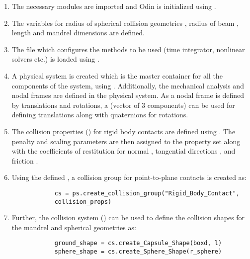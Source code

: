 \begin{enumerate}
    \item The necessary modules are imported and Odin is initialized using .
    \item The variables for radius of spherical collision geometries , radius of beam , length  and mandrel dimensions are defined.
    \item The  file which configures the methods to be used (time integrator, nonlinear solvers etc.) is loaded using .
    \item A physical system is created which is the master container for all the components of the system, using . Additionally, the mechanical analysis and nodal frames are defined in the physical system. As a nodal frame is defined by translations and rotations, a  (vector of 3 components) can be used for defining translations along with quaternions for rotations.
    \item The collision properties () for rigid body contacts are defined using . The penalty and scaling parameters are then assigned to the property set along with the coefficients of restitution for normal , tangential directions , and friction .
    \item Using the defined  , a collision group for point-to-plane contacts is created as:
        \pythonstyle
        \begin{tcolorbox}\begin{lstlisting}
            cs = ps.create_collision_group("Rigid_Body_Contact", 
            collision_props)
        \end{lstlisting}\end{tcolorbox}
    \item Further, the collision system () can be used to define the collision shapes for the mandrel and spherical geometries as:
        \pythonstyle
        \begin{tcolorbox}\begin{lstlisting}
            ground_shape = cs.create_Capsule_Shape(boxd, l)
            sphere_shape = cs.create_Sphere_Shape(r_sphere)
        \end{lstlisting}\end{tcolorbox}

\end{enumerate}
